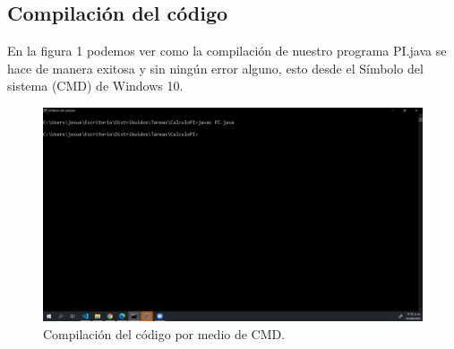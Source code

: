 \documentclass[11pt]{article}
\begin{document}
		\subsection{Compilación del código}
		En la figura 1 podemos ver como la compilación de nuestro programa PI.java se hace de manera exitosa y sin ningún error alguno, esto desde el Símbolo del sistema (CMD) de Windows 10.
		\begin{figure}[H]
			\centering
			\includegraphics[scale=0.34]{resources/compilacionpi.png}
			\caption{Compilación del código por medio de CMD. }\label{fig:picture}
		\end{figure}
\end{document}
